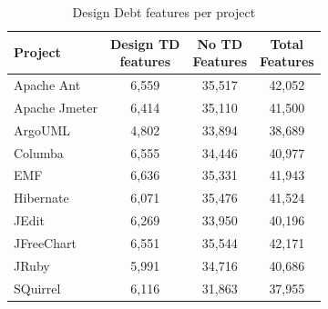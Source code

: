 \clearpage

\begin{table}[!hbt]
    \begin{center}
        \caption{Design Debt features per project}
        \label{tbl:design_features_per_project}
        \begin{tabular}{l| c c c }
        \toprule
        \textbf{Project} & \thead{Design TD\\features} & \thead{No TD\\Features} & \thead{Total\\Features} \\
        \midrule
        Apache Ant    &  6,559 & 35,517 & 42,052  \\
        Apache Jmeter &  6,414 & 35,110 & 41,500  \\
        ArgoUML       &  4,802 & 33,894 & 38,689  \\
        Columba       &  6,555 & 34,446 & 40,977  \\
        EMF           &  6,636 & 35,331 & 41,943  \\
        Hibernate     &  6,071 & 35,476 & 41,524  \\
        JEdit         &  6,269 & 33,950 & 40,196  \\
        JFreeChart    &  6,551 & 35,544 & 42,171  \\
        JRuby         &  5,991 & 34,716 & 40,686  \\
        SQuirrel      &  6,116 & 31,863 & 37,955  \\
        \bottomrule
        \end{tabular}
    \end{center}    
\end{table}

